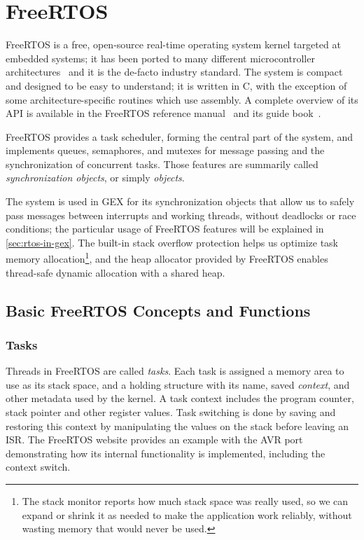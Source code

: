 \chapter{FreeRTOS} \label{sec:freertos}

FreeRTOS is a free, open-source real-time operating system kernel targeted at embedded systems; it has been ported to many different microcontroller architectures~\cite{freertos-ports-list} and it is the de-facto industry standard. The system is compact and designed to be easy to understand; it is written in C, with the exception of some architecture-specific routines which use assembly. A complete overview of its \gls{API} is available in the FreeRTOS reference manual~\cite{freertos-rm} and its guide book~\cite{freertos-book}.

FreeRTOS provides a task scheduler, forming the central part of the system, and implements queues, semaphores, and mutexes for message passing and the synchronization of concurrent tasks. Those features are summarily called \textit{synchronization objects}, or simply \textit{objects}.

The system is used in GEX for its synchronization objects that allow us to safely pass messages between interrupts and working threads, without deadlocks or race conditions; the particular usage of FreeRTOS features will be explained in \cref{sec:rtos-in-gex}. The built-in stack overflow protection helps us optimize task memory allocation\footnote{The stack monitor reports how much stack space was really used, so we can expand or shrink it as needed to make the application work reliably, without wasting memory that would never be used.}, and the heap allocator provided by FreeRTOS enables thread-safe dynamic allocation with a shared heap.

\section{Basic FreeRTOS Concepts and Functions}

\subsection{Tasks}

Threads in FreeRTOS are called \textit{tasks}. Each task is assigned a memory area to use as its stack space, and a holding structure with its name, saved \textit{context}, and other metadata used by the kernel. A task context includes the program counter, stack pointer and other register values. Task switching is done by saving and restoring this context by manipulating the values on the stack before leaving an \gls{ISR}. The FreeRTOS website provides an example with the AVR port~\cite{freertos-task-switching} demonstrating how its internal functionality is implemented, including the context switch.


